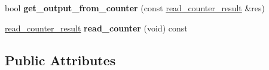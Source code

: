 \begin{DoxyCompactItemize}
\item 
\hypertarget{structPIT__Block_a4e906e99277c593789329b83e7363833}{bool {\bfseries get\-\_\-output\-\_\-from\-\_\-counter} (const \hyperlink{structPIT__Block_1_1read__counter__result}{read\-\_\-counter\-\_\-result} \&res)}\label{structPIT__Block_a4e906e99277c593789329b83e7363833}

\item 
\hypertarget{structPIT__Block_a00cc3e2937b90310ca6ecb020eb54768}{\hyperlink{structPIT__Block_1_1read__counter__result}{read\-\_\-counter\-\_\-result} {\bfseries read\-\_\-counter} (void) const }\label{structPIT__Block_a00cc3e2937b90310ca6ecb020eb54768}

\end{DoxyCompactItemize}
\subsection*{Public Attributes}
